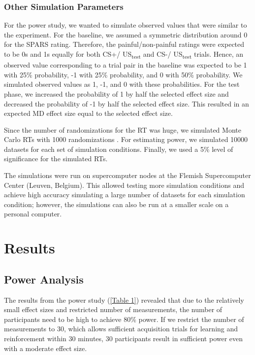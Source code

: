 \documentclass{article}
\begin{document}
\subsubsection{Other Simulation Parameters} 

For the power study, we wanted to simulate observed values that were similar to the experiment. For the baseline, we assumed a symmetric distribution around 0 for the SPARS rating. Therefore, the painful/non-painful ratings were expected to be 0s and 1s equally for both CS+/ US\textsubscript{test} and CS-/ US\textsubscript{test} trials. Hence, an observed value corresponding to a trial pair in the baseline was expected to be 1 with 25\% probability, -1 with 25\% probability, and 0 with 50\% probability. We simulated observed values as 1, -1, and 0 with these probabilities. For the test phase, we increased the probability of 1 by half the selected effect size and decreased the probability of -1 by half the selected effect size. This resulted in an expected MD effect size equal to the selected effect size. 

Since the number of randomizations for the RT was huge, we simulated Monte Carlo RTs with 1000 randomizations \autocite{bib49}. For estimating power, we simulated 10000 datasets for each set of simulation conditions. Finally, we used a 5\% level of significance for the simulated RTs.

The simulations were run on supercomputer nodes at the Flemish Supercomputer Center (Leuven, Belgium). This allowed testing more simulation conditions and achieve high accuracy simulating a large number of datasets for each simulation condition; however, the simulations can also be run at a smaller scale on a personal computer. 

\section{Results} 

\subsection{Power Analysis} 

The results from the power study (\ref{Table 1}) revealed that due to the relatively small effect sizes and restricted number of measurements, the number of participants need to be high to achieve 80\% power. If we restrict the number of measurements to 30, which allows sufficient acquisition trials for learning and reinforcement within 30 minutes, 30 participants result in sufficient power even with a moderate effect size. 
\end{document}
